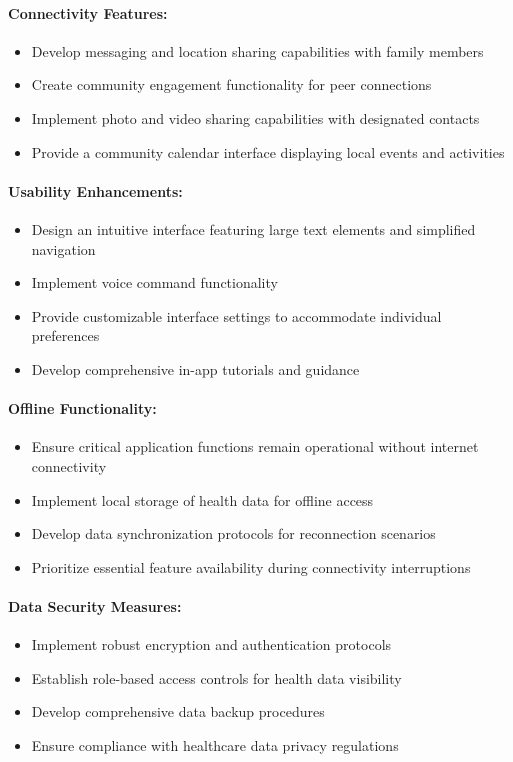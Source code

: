 \paragraph{Connectivity Features:}
\begin{itemize}
    \item Develop messaging and location sharing capabilities with family members
    \item Create community engagement functionality for peer connections
    \item Implement photo and video sharing capabilities with designated contacts
    \item Provide a community calendar interface displaying local events and activities
\end{itemize}

\paragraph{Usability Enhancements:}
\begin{itemize}
    \item Design an intuitive interface featuring large text elements and simplified navigation
    \item Implement voice command functionality
    \item Provide customizable interface settings to accommodate individual preferences
    \item Develop comprehensive in-app tutorials and guidance
\end{itemize}

\paragraph{Offline Functionality:}
\begin{itemize}
    \item Ensure critical application functions remain operational without internet connectivity
    \item Implement local storage of health data for offline access
    \item Develop data synchronization protocols for reconnection scenarios
    \item Prioritize essential feature availability during connectivity interruptions
\end{itemize}

\paragraph{Data Security Measures:}
\begin{itemize}
    \item Implement robust encryption and authentication protocols
    \item Establish role-based access controls for health data visibility
    \item Develop comprehensive data backup procedures
    \item Ensure compliance with healthcare data privacy regulations
\end{itemize}

